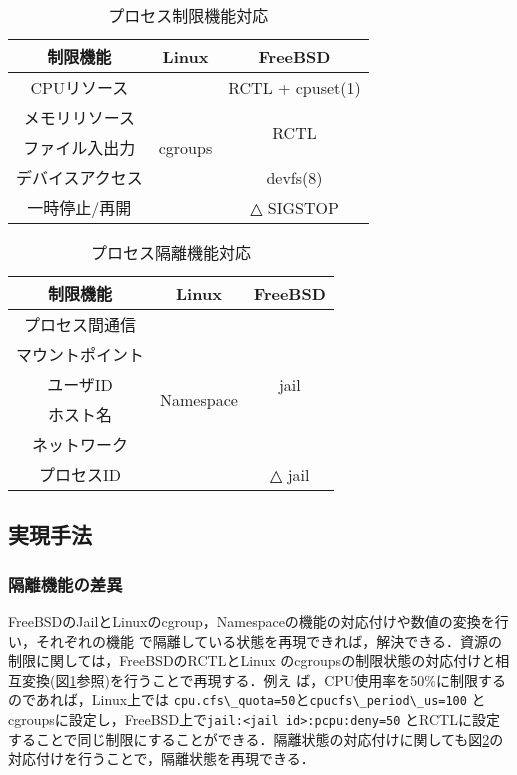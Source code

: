 \documentclass[11pt]{jarticle}
\begin{document}
\begin{table}
  \caption{プロセス制限機能対応}
  \label{tb:limit}
  \begin{center}
  \begin{tabular}{|c|c|c|} \hline
    制限機能 & Linux & FreeBSD \\ \hline \hline
    CPUリソース & \multirow{5}{*}{cgroups} &  RCTL + cpuset(1) \\ \cline{1-1} \cline{3-3}
    メモリリソース &  &  \multirow{2}{*}{RCTL} \\ \cline{1-1}
    ファイル入出力 &  &  \\ \cline{1-1} \cline{3-3}
    デバイスアクセス &  & devfs(8) \\ \cline{1-1} \cline{3-3}
    一時停止/再開 &  & △ SIGSTOP \\ \hline
  \end{tabular}
\end{center}
\end{table}

\begin{table}
  \caption{プロセス隔離機能対応}
  \label{tb:isolation}
  \begin{center}
  \begin{tabular}{|c|c|c|} \hline
    制限機能 & Linux & FreeBSD \\ \hline \hline
    プロセス間通信 & \multirow{6}{*}{Namespace} &  \multirow{5}{*}{jail} \\ \cline{1-1}
    マウントポイント &  & \\ \cline{1-1}
    ユーザID &  &  \\ \cline{1-1}
    ホスト名 &  & \\ \cline{1-1}
    ネットワーク &  & \\ \cline{1-1} \cline{3-3}
    プロセスID &  & △ jail \\ \hline
  \end{tabular}
\end{center}
\end{table}

\subsection{実現手法}
\subsubsection{隔離機能の差異}
FreeBSDのJailとLinuxのcgroup，Namespaceの機能の対応付けや数値の変換を行い，それぞれの機能
で隔離している状態を再現できれば，解決できる．資源の制限に関しては，FreeBSDのRCTLとLinux
のcgroupsの制限状態の対応付けと相互変換(図\ref{tb:limit}参照)を行うことで再現する．例え
ば，CPU使用率を50\%に制限するのであれば，Linux上では
\verb|cpu.cfs\_quota=50|と\verb|cpucfs\_period\_us=100|
とcgroupsに設定し，FreeBSD上で\verb|jail:<jail id>:pcpu:deny=50|
とRCTLに設定することで同じ制限にすることができる．隔離状態の対応付けに関しても図\ref{tb:isolation}の対応付けを行うことで，隔離状態を再現できる．
\end{document}
